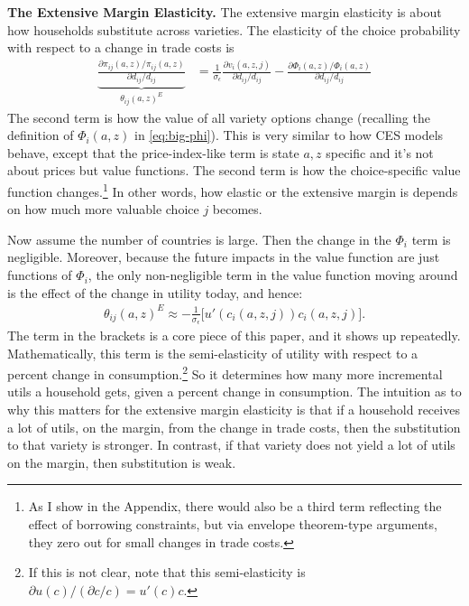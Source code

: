 \documentclass[12pt,pdftex]{article}
\begin{document}
\begin{onehalfspacing}
\textbf{The Extensive Margin Elasticity.} The extensive margin elasticity is about how households substitute across varieties. The elasticity of the choice probability with respect to a change in trade costs is
\begin{align}
\underbrace{ \frac{\partial \pi_{ij}(a,z) / \pi_{ij}(a,z)}{\partial d_{ij} / d_{ij}} }_{\theta_{ij}(a,z)^{E}} &=
 \frac{1}{\sigma_{\epsilon}}\frac{\partial v_{i}(a,z,j)}{\partial d_{ij}/d_{ij}} - \frac{\partial \Phi_{i}(a,z) / \Phi_{i}(a,z)}{\partial d_{ij}/d_{ij}}
\label{eq:extensive-margin}
\end{align}
The second term is how the value of all variety options change (recalling the definition of $\Phi_{i}(a,z)$  in \ref{eq:big-phi}). This is very similar to how CES models behave, except that the price-index-like term is state $a,z$ specific and it's not about prices but value functions. The second term is how the choice-specific value function changes.\footnote{As I show in the Appendix, there would also be a third term reflecting the effect of borrowing constraints, but via envelope theorem-type arguments, they zero out for small changes in trade costs.} In other words, how elastic or the extensive margin is depends on how much more valuable choice $j$ becomes.

Now assume the number of countries is large. Then the change in the $\Phi_{i}$ term is negligible. Moreover, because the future impacts in the value function are just functions of $\Phi_{i}$, the only non-negligible term in the value function moving around is the effect of the change in utility today, and hence:
\begin{align}
\theta_{ij}(a,z)^{E} \approx -\frac{1}{\sigma_{\epsilon}}\bigg[u'(c_{i}(a,z,j))c_{i}(a,z,j)\bigg]. \label{eq:extensive-margin-large}
\end{align}
The term in the brackets is a core piece of this paper, and it shows up repeatedly. Mathematically, this term is the semi-elasticity of utility with respect to a percent change in consumption.\footnote{If this is not clear, note that this semi-elasticity is $ \partial u(c) / ( \partial c / c) = u'(c)c $.} So it determines how many more incremental utils a household gets, given a percent change in consumption. The intuition as to why this matters for the extensive margin elasticity is that if a household receives a lot of utils, on the margin, from the change in trade costs, then the substitution to that variety is stronger. In contrast, if that variety does not yield a lot of utils on the margin, then substitution is weak.


\end{onehalfspacing}
\end{document}
